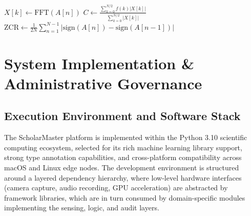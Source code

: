 \documentclass[12pt,a4paper,oneside]{report}
\begin{document}
\begin{algorithm}[H]
\caption{Non-Semantic Acoustic Feature Extraction \& Thresholding}

$X[k] \leftarrow \text{FFT}(A[n])$ 
$C \leftarrow \frac{\sum_{k=0}^{N/2} f(k) |X[k]|}{\sum_{k=0}^{N/2} |X[k]|}$ 
$\text{ZCR} \leftarrow \frac{1}{2N} \sum_{n=1}^{N-1} |\text{sign}(A[n]) - \text{sign}(A[n-1])|$ 
\;
\end{algorithm}

\chapter{System Implementation \& Administrative Governance}
\thispagestyle{empty}

\section{Execution Environment and Software Stack}
The ScholarMaster platform is implemented within the Python 3.10 scientific computing ecosystem, selected for its rich machine learning library support, strong type annotation capabilities, and cross-platform compatibility across macOS and Linux edge nodes. The development environment is structured around a layered dependency hierarchy, where low-level hardware interfaces (camera capture, audio recording, GPU acceleration) are abstracted by framework libraries, which are in turn consumed by domain-specific modules implementing the sensing, logic, and audit layers.
\end{document}
